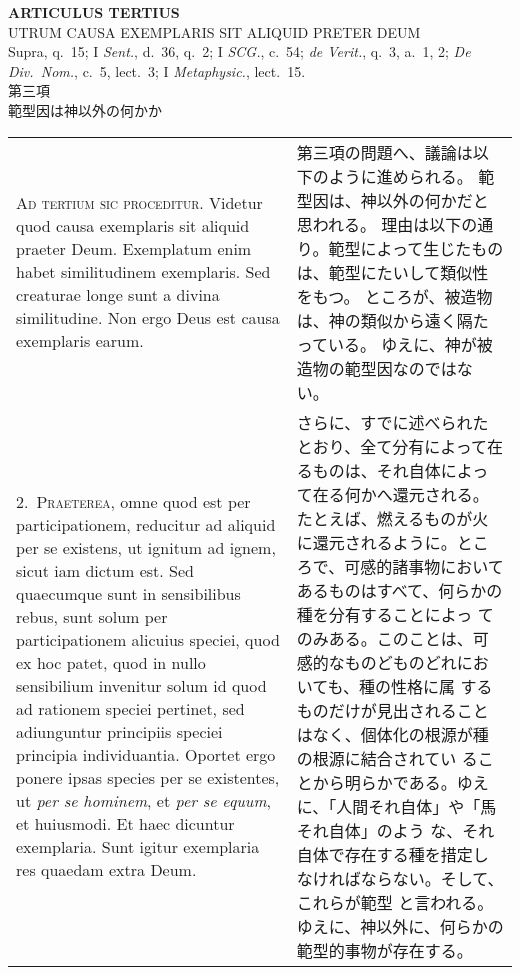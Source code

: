 \documentclass[10pt]{jsarticle} %
\begin{document}
\begin{center}
 {\Large {\bf ARTICULUS TERTIUS}}\\
 {\large UTRUM CAUSA EXEMPLARIS SIT ALIQUID PRETER DEUM}\\
 {\footnotesize Supra, q.~15; I {\itshape Sent.}, d.~36, q.~2; I
 {\itshape SCG.}, c.~54; {\itshape de Verit.}, q.~3, a.~1, 2; {\itshape
 De Div.~Nom.}, c.~5, lect.~3; I {\itshape Metaphysic.}, lect.~15.}\\
 {\Large 第三項\\範型因は神以外の何かか}
\end{center}

\begin{longtable}{p{21em}p{21em}}
{\huge A}{\scshape d tertium sic proceditur}. Videtur quod
causa exemplaris sit aliquid praeter Deum. Exemplatum enim habet
similitudinem exemplaris. Sed creaturae longe sunt a divina
similitudine. Non ergo Deus est causa exemplaris earum.

&

第三項の問題へ、議論は以下のように進められる。
範型因は、神以外の何かだと思われる。
理由は以下の通り。範型によって生じたものは、範型にたいして類似性をもつ。
ところが、被造物は、神の類似から遠く隔たっている。
ゆえに、神が被造物の範型因なのではない。


\\


2.~{\scshape Praeterea}, omne quod est per participationem, reducitur ad
aliquid per se existens, ut ignitum ad ignem, sicut iam dictum est. Sed
quaecumque sunt in sensibilibus rebus, sunt solum per participationem
alicuius speciei, quod ex hoc patet, quod in nullo sensibilium invenitur
solum id quod ad rationem speciei pertinet, sed adiunguntur principiis
speciei principia individuantia. Oportet ergo ponere ipsas species per
se existentes, ut {\itshape per se hominem}, et {\itshape per se equum},
et huiusmodi. Et haec dicuntur exemplaria. Sunt igitur exemplaria res
quaedam extra Deum.

&

さらに、すでに述べられたとおり、全て分有によって在るものは、それ自体によっ
 て在る何かへ還元される。たとえば、燃えるものが火に還元されるように。とこ
 ろで、可感的諸事物においてあるものはすべて、何らかの種を分有することによっ
 てのみある。このことは、可感的なものどものどれにおいても、種の性格に属
 するものだけが見出されることはなく、個体化の根源が種の根源に結合されてい
 ることから明らかである。ゆえに、「人間それ自体」や「馬それ自体」のよう
 な、それ自体で存在する種を措定しなければならない。そして、これらが範型
 と言われる。ゆえに、神以外に、何らかの範型的事物が存在する。


\end{longtable}
\end{document}
